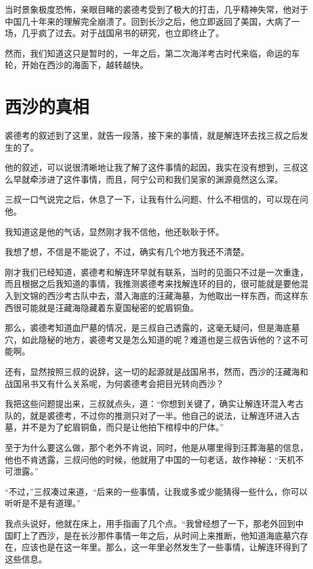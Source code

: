 当时景象极度恐怖，亲眼目睹的裘德考受到了极大的打击，几乎精神失常，他对于中国几十年来的理解完全崩溃了。回到长沙之后，他立即返回了美国，大病了一场，几乎疯了过去。对于战国帛书的研究，也立即终止了。

然而，我们知道这只是暂时的，一年之后，第二次海洋考古时代来临，命运的车轮，开始在西沙的海面下，越转越快。

\chapter{西沙的真相}

裘德考的叙述到了这里，就告一段落，接下来的事情，就是解连环去找三叔之后发生的了。

他的叙述，可以说很清晰地让我了解了这件事情的起因，我实在没有想到，三叔这么早就牵涉进了这件事情，而且，阿宁公司和我们吴家的渊源竟然这么深。

三叔一口气说完之后，休息了一下，让我有什么问题、什么不相信的，可以现在问他。

我知道这是他的气话，显然刚才我不信他，他还耿耿于怀。

我想了想，不信是不能说了，不过，确实有几个地方我还不清楚。

刚才我们已经知道，裘德考和解连环早就有联系，当时的见面只不过是一次重逢，而且根据之后我知道的事情，我推测裘德考来找解连环的目的，很可能就是要他混入到文锦的西沙考古队中去，潜入海底的汪藏海墓，为他取出一样东西，而这样东西很可能就是汪藏海隐藏着东夏国秘密的蛇眉铜鱼。

那么，裘德考知道血尸墓的情况，是三叔自己透露的，这毫无疑问，但是海底墓穴，如此隐秘的地方，裘德考又是怎么知道的呢？难道也是三叔告诉他的？这不可能啊。

还有，显然按照三叔的说辞，这一切的起源就是战国帛书，然而，西沙的汪藏海和战国帛书又有什么关系呢，为何裘德考会把目光转向西沙？

我把这些问题提出来，三叔就点头，道：“你想到关键了，确实让解连环混入考古队的，就是裘德考，不过你的推测只对了一半。他自己的说法，让解连环进入古墓，并不是为了蛇眉铜鱼，而只是让他拍下棺椁中的尸体。”

至于为什么要这么做，那个老外不肯说，同时，他是从哪里得到汪葬海墓的信息，他也不肯透露，三叔问他的时候，他就用了中国的一句老话，故作神秘：“天机不可泄露。”

“不过，”三叔凑过来道，“后来的一些事情，让我或多或少能猜得一些什么，你可以听听是不是有道理。”

我点头说好，他就在床上，用手指画了几个点。“我曾经想了一下，那老外回到中国盯上了西沙，是在长沙那件事情一年之后，从时间上来推断，他知道海底墓穴存在，应该也是在这一年里。那么，这一年里必然发生了一些事情，让解连环得到了这些信息。

